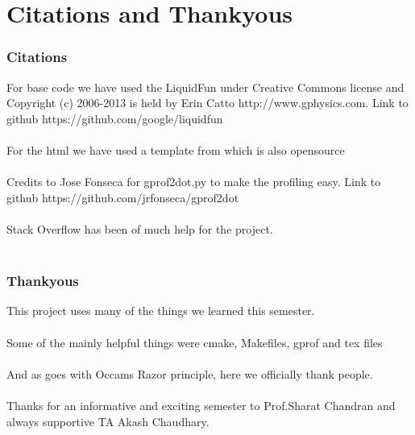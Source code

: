 \documentclass[t,compress,11pt,xcolor=dvipsnames]{beamer}
\begin{document}
\section{Citations and Thankyous }
\begin{frame}
\frametitle{Citations}
For base code we have used the LiquidFun under Creative Commons license and Copyright (c) 2006-2013 is held by Erin Catto http://www.gphysics.com. Link to github https://github.com/google/liquidfun \\~\\
For the html we have used a template from which is also opensource \\~\\
Credits to Jose Fonseca for gprof2dot.py to make the profiling easy. Link to github https://github.com/jrfonseca/gprof2dot\\~\\
Stack Overflow has been of much help for the project. \\~\\
\end{frame}
\begin{frame}
\frametitle{Thankyous}
This project uses many of the things we learned this semester.\\~\\
Some of the mainly helpful things were cmake, Makefiles, gprof and tex files\\~\\
And as goes with Occams Razor principle, here we officially thank people.\\~\\
Thanks for an informative and exciting semester to Prof.Sharat Chandran and always supportive TA Akash Chaudhary.\\~\\
\end{frame}
\end{document}
